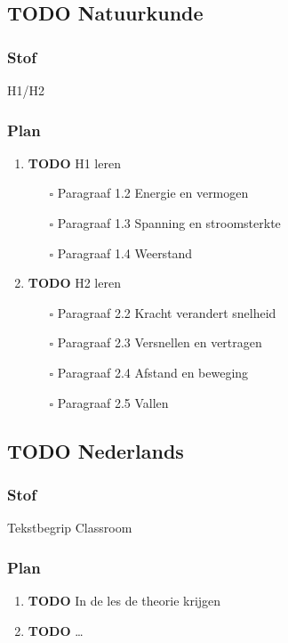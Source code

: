 \documentclass[11pt]{article}
\begin{document}
\subsection{{\bfseries\sffamily TODO} Natuurkunde}
\label{sec:org9701f1a}
\subsubsection{Stof}
\label{sec:org033ba52}
H1/H2
\subsubsection{Plan}
\label{sec:orgacfa0e4}
\begin{enumerate}
\item {\bfseries\sffamily TODO} H1 leren
\label{sec:orgd95fe45}
\begin{itemize}
\item[{$\square$}] Paragraaf 1.2 Energie en vermogen
\item[{$\square$}] Paragraaf 1.3 Spanning en stroomsterkte
\item[{$\square$}] Paragraaf 1.4 Weerstand
\end{itemize}
\item {\bfseries\sffamily TODO} H2 leren
\label{sec:orgc73ee69}
\begin{itemize}
\item[{$\square$}] Paragraaf 2.2 Kracht verandert snelheid
\item[{$\square$}] Paragraaf 2.3 Versnellen en vertragen
\item[{$\square$}] Paragraaf 2.4 Afstand en beweging
\item[{$\square$}] Paragraaf 2.5 Vallen
\end{itemize}
\end{enumerate}
\subsection{{\bfseries\sffamily TODO} Nederlands}
\label{sec:orgcdc0cd3}
\subsubsection{Stof}
\label{sec:orgb649502}
Tekstbegrip Classroom
\subsubsection{Plan}
\label{sec:org6925697}
\begin{enumerate}
\item {\bfseries\sffamily TODO} In de les de theorie krijgen
\label{sec:org65ca094}
\item {\bfseries\sffamily TODO} \ldots{}
\label{sec:orgc5112fd}
\end{enumerate}
\end{document}
